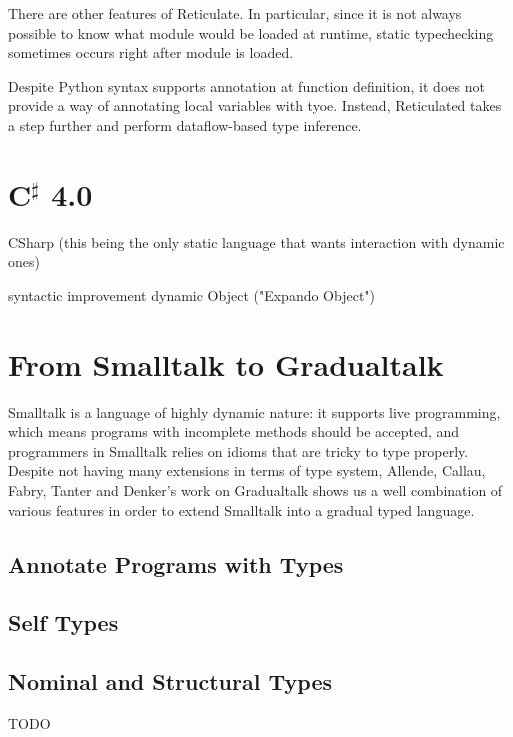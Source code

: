 There are other features of Reticulate.
In particular, since it is not always possible to know what module would be loaded
at runtime, static typechecking sometimes occurs right after module is loaded.

Despite Python syntax supports annotation at function definition,
it does not provide a way of annotating local variables with tyoe.
Instead, Reticulated takes a step further and perform dataflow-based type inference.

\section{C$^\sharp$ 4.0}

CSharp (this being the only static language that wants interaction with dynamic ones)

syntactic improvement
dynamic Object ("Expando Object")

\section{From Smalltalk to Gradualtalk}

Smalltalk is a language of highly dynamic nature:
it supports live programming, which means programs with incomplete
methods should be accepted, and programmers in Smalltalk relies on
idioms that are tricky to type properly.
Despite not having many extensions in terms of type system,
Allende, Callau, Fabry, Tanter and Denker's work on Gradualtalk shows
us a well combination of various features in order to extend Smalltalk
into a gradual typed language.

\subsection{Annotate Programs with Types}

\subsection{Self Types}

\subsection{Nominal and Structural Types}

TODO